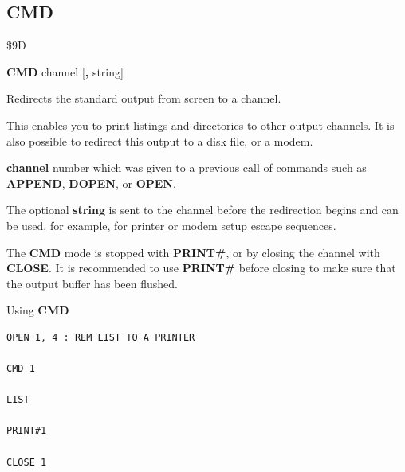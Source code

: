 \subsection{CMD}
\begin{description}[leftmargin=2cm,style=nextline]
\item [Token:]   \$9D

\item [Format:]  {\bf CMD} channel [{\bf,} string]

\item [Usage:]   Redirects the standard output from screen to a channel.

                 This enables you to print listings and directories to other output channels. It is also possible to redirect this output to a disk file, or a modem.

                 {\bf channel} number which was given to a previous call of commands such as {\bf APPEND}, {\bf DOPEN}, or {\bf OPEN}.

                 The optional {\bf string} is sent to the channel before the redirection begins and can be used, for example, for printer or modem setup escape sequences.

\item [Remarks:] The {\bf CMD} mode is stopped with {\bf PRINT\#}, or by closing the channel with {\bf CLOSE}. It is recommended to use {\bf PRINT\#} before closing to make sure that the output buffer has been flushed.

\item [Example:] Using {\bf CMD}

\begin{tcolorbox}[colback=black,coltext=white]
\verbatimfont{\codefont}
\begin{verbatim}
OPEN 1, 4 : REM LIST TO A PRINTER

CMD 1

LIST

PRINT#1

CLOSE 1
\end{verbatim}
\end{tcolorbox}
\end{description}


\newpage
